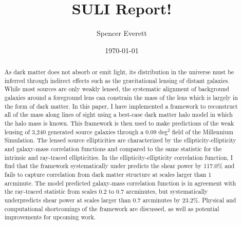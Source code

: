 \documentclass[%
 reprint,
 amsmath,amssymb,
 aps,nofootinbib
]{revtex4-1}
\begin{document}

\title{SULI Report!}

\author{Spencer Everett}


\date{\today}

\begin{abstract}
As dark matter does not absorb or emit light, its distribution in the universe must be inferred through indirect effects such as the gravitational lensing of distant galaxies. While most sources are only weakly lensed, the systematic alignment of background galaxies around a foreground lens can constrain the mass of the lens which is largely in the form of dark matter. In this paper, I have implemented a framework to reconstruct all of the mass along lines of sight using a  best-case dark matter halo model in which the halo mass is known. This framework is then used to make predictions of the weak lensing of 3,240 generated source galaxies through a 0.09 deg$^2$ field of the Millennium Simulation. The lensed source ellipticities are characterized by the ellipticity-ellipticity and galaxy-mass correlation functions and compared to the same statistic for the intrinsic and ray-traced ellipticities. In the ellipticity-ellipticity correlation function, I find that the framework systematically under predicts the shear power by 117.0\% and fails to capture correlation from dark matter structure at scales larger than 1 arcminute. The model predicted galaxy-mass correlation function is in agreement with the ray-traced statistic from scales 0.2 to 0.7 arcminutes, but systematically underpredicts shear power at scales larger than 0.7 arcminutes by 23.2\%. Physical and computational shortcomings of the framework are discussed, as well as potential improvements for upcoming work.
\end{abstract}

\maketitle
\end{document}
